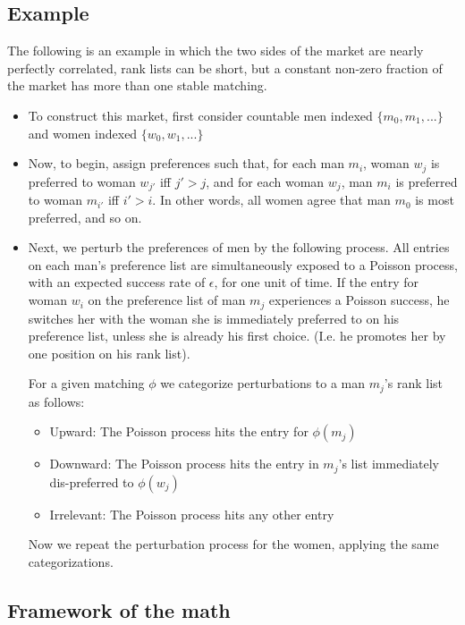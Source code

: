\documentclass[WP]{AEA}
\begin{document}
\subsection{Example }
The following is an example in which the two sides of the market are nearly perfectly correlated, rank lists can be short, but a constant non-zero fraction of the market has more than one stable matching.
\begin{itemize}
	\item To construct this market, first consider countable men indexed $\{ m_0, m_1, ...\}$ and women indexed $\{ w_0, w_1, ...\}$
	
	\item Now, to begin, assign preferences such that, for each man $m_i$, woman $w_j$ is preferred to woman $w_{j'}$ iff $j' > j$, and for each woman $w_j$, man $m_i$ is preferred to woman $m_{i'}$ iff $i' > i$.  In other words, all women agree that man $m_0$ is most preferred, and so on. 
	

	
	\item Next, we perturb the preferences of men by the following process.  All entries on each man's preference list are simultaneously exposed to a Poisson process, with an expected success rate of $\epsilon$, for one unit of time. If the entry for woman $w_i$ on the preference list of man $m_j$ experiences a Poisson success, he switches her with the woman she is immediately preferred to on his preference list, unless she is already his first choice. (I.e. he promotes her by one position on his rank list).
	
	
	For a given matching $\phi$ we categorize perturbations to a man $m_j$'s rank list as follows:
	\begin{itemize}
		\item Upward: The Poisson process hits the entry for $\phi(m_j)$

		
		\item Downward: The Poisson process hits the entry in $m_j$'s list immediately dis-preferred to $\phi(w_j)$
		\item Irrelevant: The Poisson process hits any other entry 
		
	\end{itemize}
	
	Now we repeat the perturbation process for the women, applying the same categorizations.
	

\end{itemize}


\subsection{Framework of the math}
\end{document}
